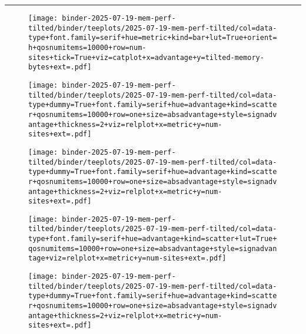 \begin{figure*}
\vspace{2ex}

\hrule

\vspace{1ex}

\begin{subfigure}{\textwidth}

\texttt{[image: binder-2025-07-19-mem-perf-tilted/binder/teeplots/2025-07-19-mem-perf-tilted/col=data-type+font.family=serif+hue=metric+kind=bar+lut=True+orient=h+qosnumitems=10000+row=num-sites+tick=True+viz=catplot+x=advantage+y=tilted-memory-bytes+ext=.pdf]}

\vspace{-1ex}

\texttt{[image: binder-2025-07-19-mem-perf-tilted/binder/teeplots/2025-07-19-mem-perf-tilted/col=data-type+dummy=True+font.family=serif+hue=advantage+kind=scatter+qosnumitems=10000+row=one+size=absadvantage+style=signadvantage+thickness=2+viz=relplot+x=metric+y=num-sites+ext=.pdf]}

\vspace{-3ex}

\texttt{[image: binder-2025-07-19-mem-perf-tilted/binder/teeplots/2025-07-19-mem-perf-tilted/col=data-type+dummy=True+font.family=serif+hue=advantage+kind=scatter+qosnumitems=10000+row=one+size=absadvantage+style=signadvantage+thickness=2+viz=relplot+x=metric+y=num-sites+ext=.pdf]}

\vspace{-1.2ex}

\texttt{[image: binder-2025-07-19-mem-perf-tilted/binder/teeplots/2025-07-19-mem-perf-tilted/col=data-type+font.family=serif+hue=advantage+kind=scatter+lut=True+qosnumitems=10000+row=one+size=absadvantage+style=signadvantage+viz=relplot+x=metric+y=num-sites+ext=.pdf]}

\vspace{-2.8ex}

\texttt{[image: binder-2025-07-19-mem-perf-tilted/binder/teeplots/2025-07-19-mem-perf-tilted/col=data-type+dummy=True+font.family=serif+hue=advantage+kind=scatter+qosnumitems=10000+row=one+size=absadvantage+style=signadvantage+thickness=2+viz=relplot+x=metric+y=num-sites+ext=.pdf]}

\vspace{-1ex}


\end{subfigure}
\end{figure*}
